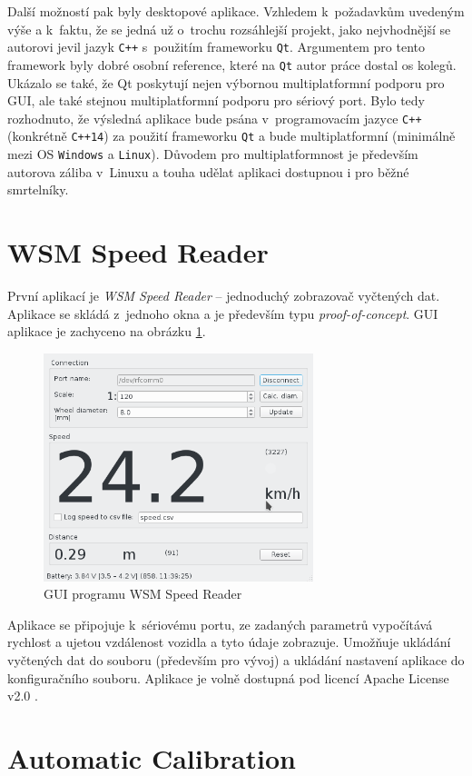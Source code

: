 Další možností pak byly desktopové aplikace. Vzhledem k~požadavkům uvedeným
výše a k~faktu, že se jedná už o~trochu rozsáhlejší projekt, jako nejvhodnější
se autorovi jevil jazyk \texttt{C++} s~použitím frameworku \texttt{Qt}.
Argumentem pro tento framework byly dobré osobní reference, které na
\texttt{Qt} autor práce dostal os kolegů. Ukázalo se také, že Qt poskytují
nejen výbornou multiplatformní podporu pro GUI, ale také stejnou
multiplatformní podporu pro sériový port. Bylo tedy rozhodnuto, že výsledná
aplikace bude psána v~programovacím jazyce \texttt{C++} (konkrétně
\texttt{C++14}) za použití frameworku \texttt{Qt} a bude multiplatformní
(minimálně mezi OS \texttt{Windows} a \texttt{Linux}). Důvodem pro
multiplatformnost je především autorova záliba v~Linuxu a touha udělat aplikaci
dostupnou i pro běžné smrtelníky.

\section{WSM Speed Reader}
\label{sec:sw-wsm-speed-reader}

První aplikací je \textit{WSM Speed Reader} -- jednoduchý zobrazovač vyčtených
dat. Aplikace se skládá z~jednoho okna a je především typu
\textit{proof-of-concept}. GUI aplikace je zachyceno na obrázku
\ref{fig:wsm-speed-reader-gui}.

\begin{figure}[h]
\includegraphics[width=0.7\textwidth]{data/speed_reader_screenshot.png}
\caption{GUI programu WSM Speed Reader}
\label{fig:wsm-speed-reader-gui}
\end{figure}

Aplikace se připojuje k~sériovému portu, ze zadaných parametrů vypočítává
rychlost a ujetou vzdálenost vozidla a tyto údaje zobrazuje. Umožňuje ukládání
vyčtených dat do souboru (především pro vývoj) a ukládání nastavení aplikace
do konfiguračního souboru. Aplikace je volně dostupná pod licencí Apache
License v2.0 \cite{wsm-speed-reader}.

\section{Automatic Calibration}
\label{sec:sw-wsm-auto-calib}
